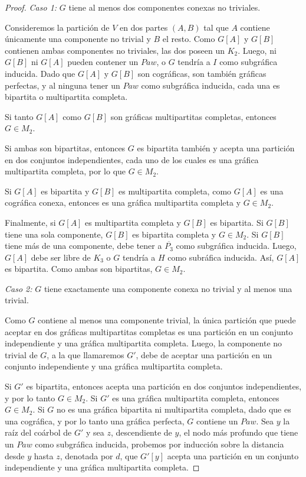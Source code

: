 \begin{proof}
    \emph{Caso 1:} $G$ tiene al menos dos componentes conexas no triviales.

    Consideremos la partición de $V$ en dos partes $(A,B)$ tal que $A$ contiene
    únicamente una componente no trivial y $B$ el resto. Como $G[A]$ y $G[B]$
    contienen ambas componentes no triviales, las dos poseen un $K_2$. Luego, ni $G[B]$ ni $G[A]$ pueden contener un $Paw$, o $G$ tendría a $I$ como
    subgráfica inducida. Dado que $G[A]$ y $G[B]$ son cográficas, son también
    gráficas perfectas, y al ninguna tener un $Paw$ como subgráfica inducida,
    cada una es bipartita o multipartita completa\cite{Olariu}. 
    
    Si tanto $G[A]$ como $G[B]$ son gráficas multipartitas completas, entonces $G \in M_2$.

    Si ambas son bipartitas, entonces $G$ es bipartita también y acepta una partición en dos conjuntos independientes, cada uno de los cuales es una gráfica multipartita completa, por lo que $G \in M_2$.

    Si $G[A]$ es bipartita y $G[B]$ es multipartita completa, como $G[A]$ es una cográfica conexa, entonces es una gráfica multipartita completa y $G \in M_2$.

    Finalmente, si $G[A]$ es multipartita completa y $G[B]$ es bipartita. Si
    $G[B]$ tiene una sola componente, $G[B]$ es bipartita completa y $G \in
    M_2$. Si $G[B]$ tiene más de una componente, debe tener a $\overline{P_3}$
    como subgráfica inducida. Luego, $G[A]$ debe ser libre de $K_3$ o $G$
    tendría a $H$ como subráfica inducida. Así, $G[A]$ es bipartita. Como ambas
    son bipartitas, $G \in M_2$.
    

    \emph{Caso 2:} $G$ tiene exactamente una componente conexa no trivial y al menos una trivial.

    Como $G$ contiene al menos una componente trivial, la única partición que puede aceptar en dos gráficas multipartitas completas es una partición en un conjunto independiente y una gráfica multipartita completa. Luego, la componente no trivial de $G$, a la que llamaremos $G'$, debe de aceptar una partición en un conjunto independiente y una gráfica multipartita completa.

    Si $G'$ es bipartita, entonces acepta una partición en dos conjuntos independientes, y por lo tanto $G \in M_2$. Si $G'$ es una gráfica multipartita completa, entonces $G \in M_2$. Si $G$ no es una gráfica bipartita ni multipartita completa, dado que es una cográfica, y por lo tanto una gráfica perfecta, $G$ contiene un $Paw$. Sea $y$ la raíz del coárbol de $G'$ y sea $z$, descendiente de $y$, el nodo más profundo que tiene un $Paw$ como subgráfica inducida, probemos por inducción sobre la distancia desde $y$ hasta $z$, denotada por $d$, que $G'[y]$ acepta una partición en un conjunto independiente y una gráfica multipartita completa.


\end{proof}
